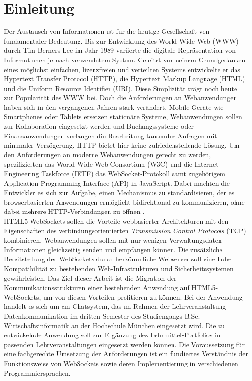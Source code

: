 \documentclass[11pt,a4paper,titlepage]{scrartcl}
\numberwithin{equation}{section}
\begin{document}
\newpage
 \tableofcontents

\newpage

  \pagestyle{headings}

\section{Einleitung}\label{sec:Einleitung}
Der Austausch von Informationen ist für die heutige Gesellschaft von fundamentaler Bedeutung. Bis zur Entwicklung des World Wide Web (WWW) durch Tim Berners-Lee im Jahr 1989 variierte die digitale Repräsentation von Informationen je nach verwendetem System. Geleitet von seinem Grundgedanken eines möglichst einfachen, lizenzfreien und verteilten Systems entwickelte er das Hypertext Transfer Protocol (HTTP), die Hypertext Markup Language (HTML) und die Uniform Resource Identifier (URI). Diese Simplizität trägt noch heute zur Popularität des WWW bei. Doch die Anforderungen an Webanwendungen haben sich in den vergangenen Jahren stark verändert. Mobile Geräte wie Smartphones oder Tablets ersetzen stationäre Systeme, Webanwendungen sollen zur Kollaboration eingesetzt werden und Buchungssysteme oder Finanzanwendungen verlangen die Bearbeitung tausender Anfragen mit minimaler Verzögerung. HTTP bietet hier keine zufriedenstellende Lösung. Um den Anforderungen an moderne Webanwendungen gerecht zu werden, spezifizierten das World Wide Web Consortium (W3C) und die Internet Engineering Taskforce (IETF) das WebSocket-Protokoll samt zugehörigem Application Programming Interface (API) in JavaScript. Dabei machten die Entwickler es sich zur Aufgabe, einen Mechanismus zu standardisieren, der es browserbasierten Anwendungen ermöglicht bidirektional zu kommunizieren, ohne dabei mehrere HTTP-Verbindungen zu öffnen \autocite{fette_websocket_2011}.\\

\noindent HTML5-WebSockets sollen die Vorteile webbasierter Architekturen mit den Eigenschaften des verbindungsorientierten \textit{Transmission Control Protocols} (TCP) kombinieren. Webanwendungen sollen mit nur wenigen Verwaltungsdaten Informationen gleichzeitig senden und empfangen können. Die zusätzliche Bereitstellung der WebSockets durch herkömmliche Webserver soll eine hohe Kompatibilität zu bestehenden Web-Infrastrukturen und Sicherheitssystemen gewährleisten. Das Ziel dieser Arbeit ist die Migration der Kommunikationsstrukturen einer bestehenden Anwendung auf HTML5-WebSockets, um von diesen Vorteilen profitieren zu können. Bei der Anwendung handelt es sich um ein Chatsystem, das im Rahmen der Lehrveranstaltung \glq Datenkommunikation\grq{} im dritten Semester des Studiengangs B.Sc. Wirtschaftsinformatik an der Hochschule München eingesetzt wird. Die zu entwickelnde Anwendung soll zur Ergänzung des Lehrmittel-Portfolios in passenden Lehrveranstaltungen eingesetzt werden können. Die Voraussetzung für eine fachgerechte Umsetzung der Anforderungen ist ein fundiertes Verständnis der Funktionsweise von WebSockets sowie deren Implementierung in verschiedenen Programmiersprachen.\\
\end{document}
